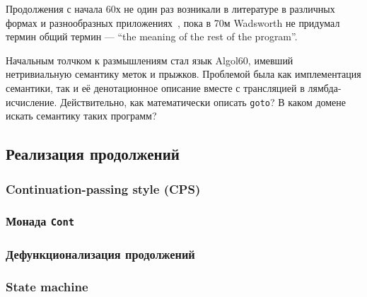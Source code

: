 
Продолжения с начала 60х не один раз возникали в литературе в различных формах и разнообразных приложениях~\cite{reynolds1993discoveries, landin1997histories}, пока в 70м Wadsworth не придумал термин общий термин  --- ``the meaning of the rest of the program''.

Начальным толчком к размышлениям стал язык Algol60, имевший нетривиальную семантику меток и прыжков.
Проблемой была как имплементация семантики, так и её денотационное описание вместе с трансляцией в лямбда-исчисление.
Действительно, как математически описать \texttt{goto}?
В каком домене искать семантику таких программ?







\subsection{Реализация продолжений}

\subsubsection{Continuation-passing style (CPS)}




\subsubsection{Монада \texttt{Cont}}



\subsubsection{Дефункционализация продолжений}

\cite{reynolds1972definitional}


\subsubsection{State machine}


